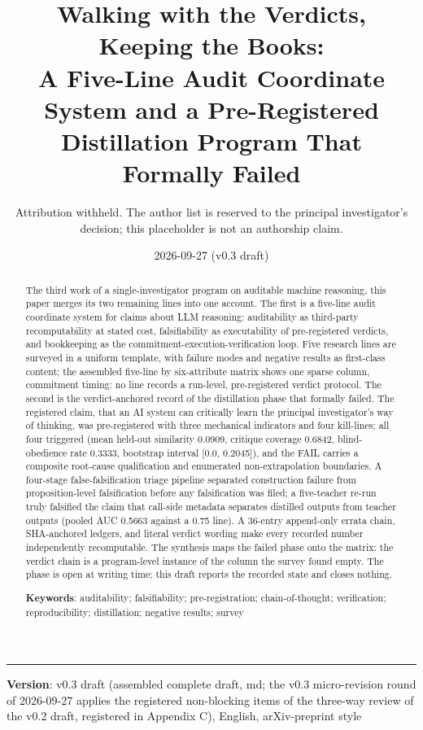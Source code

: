 \documentclass[11pt]{article}
\title{\bfseries Walking with the Verdicts, Keeping the Books:\\ A Five-Line Audit Coordinate System and a Pre-Registered\\ Distillation Program That Formally Failed}
\author{Attribution withheld. The author list is reserved to the principal investigator's decision; this placeholder is not an authorship claim.}
\date{2026-09-27 (v0.3 draft)}
\begin{document}
\maketitle
\thispagestyle{empty}

\begin{abstract}
The third work of a single-investigator program on auditable machine reasoning, this paper merges its two remaining lines into one account. The first is a five-line audit coordinate system for claims about LLM reasoning: auditability as third-party recomputability at stated cost, falsifiability as executability of pre-registered verdicts, and bookkeeping as the commitment-execution-verification loop. Five research lines are surveyed in a uniform template, with failure modes and negative results as first-class content; the assembled five-line by six-attribute matrix shows one sparse column, commitment timing: no line records a run-level, pre-registered verdict protocol. The second is the verdict-anchored record of the distillation phase that formally failed. The registered claim, that an AI system can critically learn the principal investigator's way of thinking, was pre-registered with three mechanical indicators and four kill-lines; all four triggered (mean held-out similarity 0.0909, critique coverage 0.6842, blind-obedience rate 0.3333, bootstrap interval [0.0, 0.2045]), and the FAIL carries a composite root-cause qualification and enumerated non-extrapolation boundaries. A four-stage false-falsification triage pipeline separated construction failure from proposition-level falsification before any falsification was filed; a five-teacher re-run truly falsified the claim that call-side metadata separates distilled outputs from teacher outputs (pooled AUC 0.5663 against a 0.75 line). A 36-entry append-only errata chain, SHA-anchored ledgers, and literal verdict wording make every recorded number independently recomputable. The synthesis maps the failed phase onto the matrix: the verdict chain is a program-level instance of the column the survey found empty. The phase is open at writing time; this draft reports the recorded state and closes nothing.

\medskip\noindent\textbf{Keywords}: auditability; falsifiability; pre-registration; chain-of-thought; verification; reproducibility; distillation; negative results; survey
\end{abstract}
\vspace{0.5em}\hrule\vspace{0.8em}
\noindent \textbf{Version}: v0.3 draft (assembled complete draft, md; the v0.3 micro-revision round of 2026-09-27 applies the registered non-blocking items of the three-way review of the v0.2 draft, registered in Appendix C), English, arXiv-preprint style\par\smallskip
\end{document}
